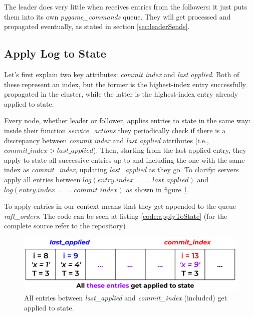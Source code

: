 The leader does very little when receives entries from the followers: it just puts them into its own \textit{pygame\_commands} queue. They will get processed and propagated eventually, as stated in section \ref{sec:leaderSends}.

\subsection{Apply Log to State}

Let's first explain two key attributes: \textit{commit index} and \textit{last applied}. Both of these represent an index, but the former is the highest-index entry successfully propagated in the cluster, while the latter is the highest-index entry already applied to state. 

Every node, whether leader or follower, applies entries to state in the same way: inside their function \textit{service\_actions} they periodically check if there is a discrepancy between \textit{commit index} and \textit{last applied} attributes (i.e., $commit\_index > last\_applied$). Then, starting from the last applied entry, they apply to state all successive entries up to and including the one with the same index as \textit{commit\_index}, updating \textit{last\_applied} as they go. To clarify: servers apply all entries between $log(entry.index == last\_applied)$ and $log(entry.index == commit\_index)$ as shown in figure \ref{fig:applyToState}. 

To apply entries in our context means that they get appended to the queue \textit{raft\_orders}. The code can be seen at listing \ref{code:applyToState} (for the complete source refer to the repository)

\begin{figure}[h]
  \centering
  \includegraphics[width=.8\linewidth]{images/applyToState.png}
  \caption{All entries between \textit{last\_applied} and \textit{commit\_index} (included) get applied to state.}
  \label{fig:applyToState}
\end{figure}

